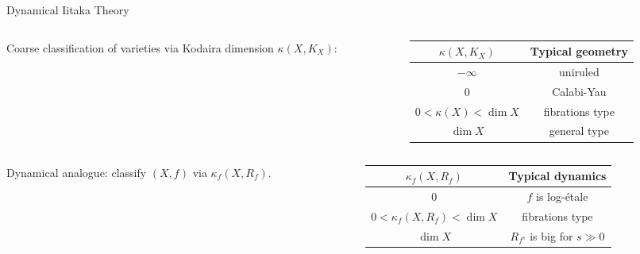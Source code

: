 \documentclass[12pt,aspectratio=1610]{ecnubeamerformyself}
\begin{document}
\begin{frame}[c]{Dynamical Iitaka Theory}

    \begin{columns}[c]  
        \begin{column}{0.4\textwidth}
            Coarse classification of varieties via Kodaira dimension \(\kappa(X,K_X)\):
        \end{column}

        \begin{column}{0.6\textwidth}
            \centering
            \begin{tabular}{c|c}
                \hline
                $\kappa(X,K_X)$         & Typical geometry  \\
                \hline
                $-\infty$               & uniruled          \\
                $0$                     & Calabi-Yau        \\
                $0<\kappa(X)<\dim X$    & fibrations type   \\
                $\dim X$                & general type      \\
                \hline
            \end{tabular}
        \end{column}
    \end{columns}

    \pause
    \vspace{0.6cm}

    \begin{columns}[c]
        \begin{column}{0.4\textwidth}
            Dynamical analogue: classify \((X,f)\) via \(\kappa_f(X,R_f)\).
        \end{column}

        \begin{column}{0.6\textwidth}
            \centering
            \begin{tabular}{c|c}
                \hline
                $\kappa_f(X,R_f)$                     & Typical dynamics                      \\
                \hline
                $0$                                   & \(f\) is log-\'etale                  \\
                \alert{$0<\kappa_f(X,R_f)<\dim X$}    & \alert{fibrations type}                       \\
                $\dim X$                              & \(R_{f^s}\) is big for \(s \gg 0\)   \\
                \hline
            \end{tabular}
        \end{column}
    \end{columns}

\end{frame}
\end{document}
